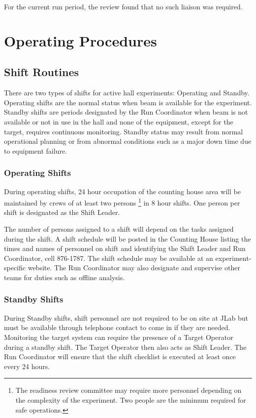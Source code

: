 \documentclass[10pt]{article}
\begin{document}
For the current run period, the review found that no such liaison was required. 


\section{Operating Procedures}

\subsection{Shift Routines}

There are two types of shifts for active hall experiments:
Operating and Standby. Operating shifts are the normal status
when beam is available for the experiment. Standby shifts are periods 
designated by the Run Coordinator when beam is not available or not in
use in the hall and none of the equipment, except for the target, requires
continuous monitoring. Standby status may result from normal operational
planning or from abnormal conditions such as a major down time due to
equipment failure.


\subsubsection{Operating Shifts}

During operating shifts, 24 hour occupation of the counting house area will 
be maintained by crews of at least two persons
\footnote{\label{fn2}The readiness review committee may require more 
personnel depending on the complexity of the experiment. Two people are 
the minimum required for safe operations.} 
in 8 hour shifts. One person per shift is designated as the Shift Leader.

The number of persons assigned to a shift will depend on the tasks assigned 
during the shift. A shift schedule will be posted in the Counting House 
listing the times and names of personnel on shift and identifying the 
Shift Leader and Run Coordinator, cell 876-1787. The shift schedule may be available at 
an experiment-specific website. The Run Coordinator may also designate 
and supervise other teams for duties such as offline analysis.

\subsubsection{Standby Shifts}

During Standby shifts, shift personnel are not required to be on site at 
JLab but must be available through telephone contact to come in if they
are needed.  Monitoring the target system can require the presence of a
Target Operator during a standby shift.  The Target Operator then also
acts as Shift Leader.  The Run Coordinator will ensure that the shift
checklist is executed at least once every 24 hours.
\end{document}
